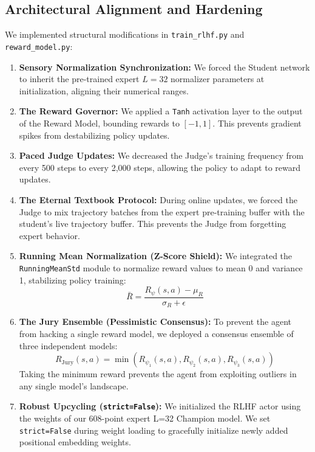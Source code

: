 \documentclass[11pt,a4paper]{article}
\begin{document}
\subsection{Architectural Alignment and Hardening}
We implemented structural modifications in \texttt{train\_rlhf.py} and \texttt{reward\_model.py}:
\begin{enumerate}
    \item \textbf{Sensory Normalization Synchronization:} We forced the Student network to inherit the pre-trained expert $L=32$ normalizer parameters at initialization, aligning their numerical ranges.
    \item \textbf{The Reward Governor:} We applied a \texttt{Tanh} activation layer to the output of the Reward Model, bounding rewards to $[-1, 1]$. This prevents gradient spikes from destabilizing policy updates.
    \item \textbf{Paced Judge Updates:} We decreased the Judge's training frequency from every 500 steps to every 2,000 steps, allowing the policy to adapt to reward updates.
    \item \textbf{The Eternal Textbook Protocol:} During online updates, we forced the Judge to mix trajectory batches from the expert pre-training buffer with the student's live trajectory buffer. This prevents the Judge from forgetting expert behavior.
    \item \textbf{Running Mean Normalization (Z-Score Shield):} We integrated the \texttt{RunningMeanStd} module to normalize reward values to mean 0 and variance 1, stabilizing policy training:
    \begin{equation}
    \bar{R} = \frac{R_\psi(s,a) - \mu_R}{\sigma_R + \epsilon}
    \end{equation}
    \item \textbf{The Jury Ensemble (Pessimistic Consensus):} To prevent the agent from hacking a single reward model, we deployed a consensus ensemble of three independent models:
    \begin{equation}
    R_{\text{Jury}}(s,a) = \min\left(R_{\psi_1}(s,a), R_{\psi_2}(s,a), R_{\psi_3}(s,a)\right)
    \end{equation}
    Taking the minimum reward prevents the agent from exploiting outliers in any single model's landscape.
    \item \textbf{Robust Upcycling (\texttt{strict=False}):} We initialized the RLHF actor using the weights of our 608-point expert L=32 Champion model. We set \texttt{strict=False} during weight loading to gracefully initialize newly added positional embedding weights.
\end{enumerate}
\end{document}

